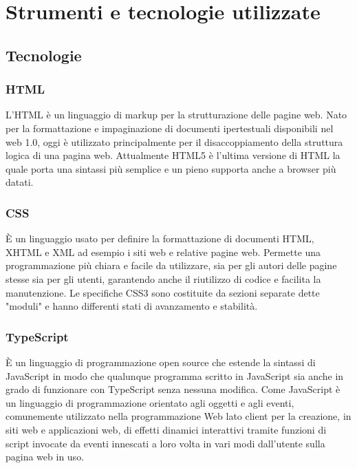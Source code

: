 \section{Strumenti e tecnologie utilizzate}

\subsection{Tecnologie}

\subsubsection*{HTML}
L'HTML è un \gls{linguaggio di markup}\ap{[g]} per la strutturazione delle pagine web. Nato per la formattazione e impaginazione di documenti ipertestuali disponibili nel web 1.0, oggi è utilizzato principalmente per il disaccoppiamento della struttura logica di una pagina web. Attualmente HTML5 è l'ultima versione di HTML la quale porta una sintassi più semplice e un pieno supporta anche a browser più datati.

\subsubsection*{CSS}
È un linguaggio usato per definire la formattazione di documenti HTML, XHTML e XML ad esempio i siti web e relative pagine web. Permette una programmazione più chiara e facile da utilizzare, sia per gli autori delle pagine stesse sia per gli utenti, garantendo anche il riutilizzo di codice e facilita la manutenzione. Le specifiche CSS3 sono costituite da sezioni separate dette "moduli" e hanno differenti stati di avanzamento e stabilità.

\subsubsection*{TypeScript}
È un linguaggio di programmazione open source che estende la sintassi di JavaScript in modo che qualunque programma scritto in JavaScript sia anche in grado di funzionare con TypeScript senza nessuna modifica. Come JavaScript è un linguaggio di programmazione orientato agli oggetti e agli eventi, comunemente utilizzato nella programmazione Web lato client per la creazione, in siti web e applicazioni web, di effetti dinamici interattivi tramite funzioni di script invocate da eventi innescati a loro volta in vari modi dall'utente sulla pagina web in uso.


